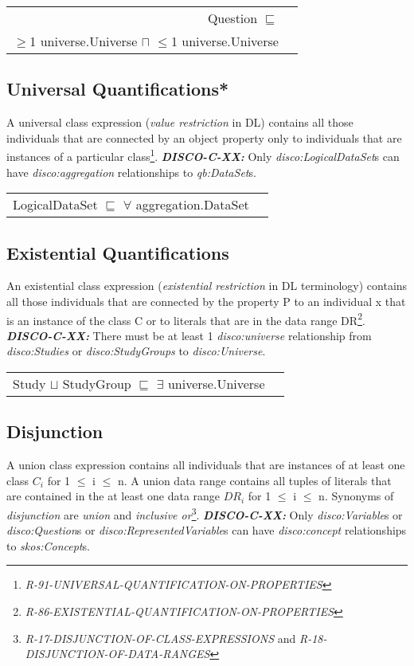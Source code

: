 \documentclass{llncs}
\newenvironment{DL}{
  \vspace{0cm}
  \begin{tabular}{r l}

}{
  \end{tabular}
}
\begin{document}
\begin{DL}
Question $\sqsubseteq$ \\
$\geq$1 universe.Universe $\sqcap$ $\leq$1 universe.Universe \\
\end{DL}

\subsection{Universal Quantifications*}

A universal class expression ({\em value restriction} in DL) contains all those individuals that are connected by an object property only to individuals that are instances of a particular class\footnote{{\em R-91-UNIVERSAL-QUANTIFICATION-ON-PROPERTIES}}.
\textbf{{\em DISCO-C-XX:}}
Only {\em disco:LogicalDataSet}s can have {\em disco:aggregation} relationships to {\em qb:DataSet}s.

\begin{DL}
LogicalDataSet $\sqsubseteq$ $\forall$ aggregation.DataSet \\
\end{DL}

\subsection{Existential Quantifications}

An existential class expression ({\em existential restriction} in DL terminology) contains all those individuals that are connected by the property P to an individual x that is an instance of the class C or to literals that are in the data range DR\footnote{{\em R-86-EXISTENTIAL-QUANTIFICATION-ON-PROPERTIES}}.
\textbf{{\em DISCO-C-XX:}} 
There must be at least 1 {\em disco:universe} relationship from {\em disco:Studies} or {\em disco:StudyGroups} to {\em disco:Universe}.

\begin{DL}
Study $\sqcup$ StudyGroup $\sqsubseteq$ $\exists$ universe.Universe \\
\end{DL}

\subsection{Disjunction}

A union class expression contains all individuals that are instances of at least one class $C_{i}$ for 1 $\leq$ i $\leq$ n. 
A union data range contains all tuples of literals that are contained in the at least one data range $DR_{i}$ for 1 $\leq$ i $\leq$ n.
Synonyms of {\em disjunction} are {\em union} and {\em inclusive or}\footnote{{\em R-17-DISJUNCTION-OF-CLASS-EXPRESSIONS} and {\em R-18-DISJUNCTION-OF-DATA-RANGES}}.
\textbf{{\em DISCO-C-XX:}} 
Only {\em disco:Variable}s or {\em disco:Question}s or {\em disco:RepresentedVariable}s can have {\em disco:concept} relationships to {\em skos:Concept}s.
\end{document}
